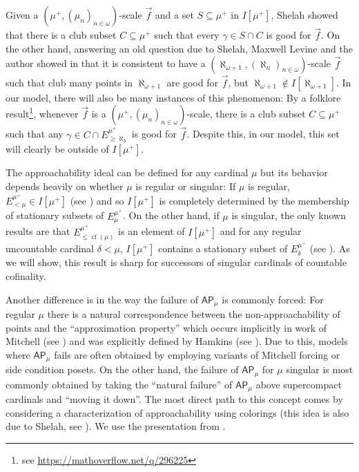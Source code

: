 \documentclass[a4paper]{amsart}
\theoremstyle{definition}
\theoremstyle{remark}
\theoremstyle{plain}
\numberwithin{mydef}{section}
\DeclareMathOperator{\cf}{cf}
\newcommand{\AP}{\mathsf{AP}}
\begin{document}
	Given a $(\mu^+,(\mu_n)_{n\in\omega})$-scale $\vec{f}$ and a set $S\subseteq\mu^+$ in $I[\mu^+]$, Shelah showed that there is a club subset $C\subseteq\mu^+$ such that every $\gamma\in S\cap C$ is good for $\vec{f}$. On the other hand, answering an old question due to Shelah, Maxwell Levine and the author showed in \cite{JakobLevineFailureApproachability} that it is consistent to have a $(\aleph_{\omega+1},(\aleph_n)_{n\in\omega})$-scale $\vec{f}$ such that club many points in $\aleph_{\omega+1}$ are good for $\vec{f}$, but $\aleph_{\omega+1}\notin I[\aleph_{\omega+1}]$. In our model, there will also be many instances of this phenomenon: By a folklore result\footnote{see \url{https://mathoverflow.net/q/296225}}, whenever $\vec{f}$ is a $(\mu^+,(\mu_n)_{n\in\omega})$-scale, there is a club subset $C\subseteq\mu^+$ such that any $\gamma\in C\cap E_{\geq\aleph_3}^{\mu^+}$ is good for $\vec{f}$. Despite this, in our model, this set will clearly be outside of $I[\mu^+]$.
	
	The approachability ideal can be defined for any cardinal $\mu$ but its behavior depends heavily on whether $\mu$ is regular or singular: If $\mu$ is regular, $E_{<\mu}^{\mu^+}\in I[\mu^+]$ (see \cite[Lemma 4.4]{ShelahApproachability}) and so $I[\mu^+]$ is completely determined by the membership of stationary subsets of $E_{\mu}^{\mu^+}$. On the other hand, if $\mu$ is singular, the only known results are that $E_{\leq\cf(\mu)}^{\mu^+}$ is an element of $I[\mu^+]$ and for any regular uncountable cardinal $\delta<\mu$, $I[\mu^+]$ contains a stationary subset of $E_{\delta}^{\mu^+}$ (see \cite[Theorem 9.2]{CummingsNotes}). As we will show, this result is sharp for successors of singular cardinals of countable cofinality.
	
	Another difference is in the way the failure of $\AP_{\mu}$ is commonly forced: For regular $\mu$ there is a natural correspondence between the non-approachability of points and the ``approximation property'' which occurs implicitly in work of Mitchell (see \cite{MitchellTreeProp}) and was explicitly defined by Hamkins (see \cite{HamkinsExtApprox}). Due to this, models where $\AP_{\mu}$ fails are often obtained by employing variants of Mitchell forcing or side condition posets. On the other hand, the failure of $\AP_{\mu}$ for $\mu$ singular is most commonly obtained by taking the ``natural failure'' of $\AP_{\mu}$ above supercompact cardinals and ``moving it down''. The most direct path to this concept comes by considering a characterization of approachability using colorings (this idea is also due to Shelah, see \cite{ShelahSuccSingCard}). We use the presentation from \cite{EisworthHandbook}.
	
\end{document}
